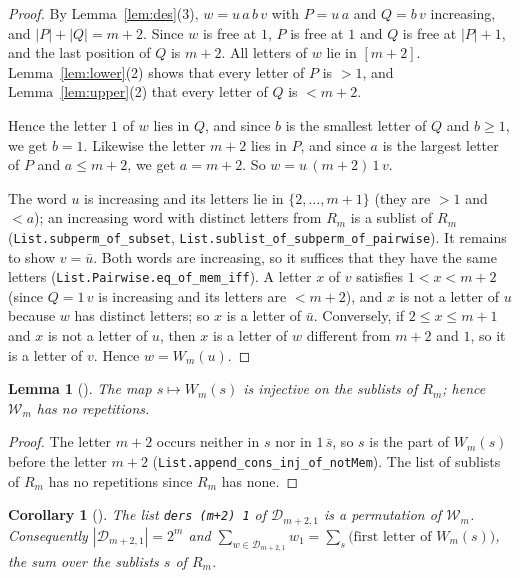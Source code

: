\documentclass[11pt]{amsart}
\theoremstyle{plain}
\newtheorem{lemma}[theorem]{Lemma}
\newtheorem{corollary}[theorem]{Corollary}
\theoremstyle{definition}
\newcommand{\cD}{\mathcal{D}}
\begin{document}
\begin{proof}
By Lemma~\ref{lem:des}(3), $w=u\,a\,b\,v$ with $P=u\,a$ and $Q=b\,v$ increasing, and $|P|+|Q|=m+2$. Since $w$ is free at $1$, $P$ is free at $1$ and $Q$ is free at $|P|+1$, and the last position of $Q$ is $m+2$. All letters of $w$ lie in $[m+2]$. Lemma~\ref{lem:lower}(2) shows that every letter of $P$ is $>1$, and Lemma~\ref{lem:upper}(2) that every letter of $Q$ is $<m+2$.

Hence the letter $1$ of $w$ lies in $Q$, and since $b$ is the smallest letter of $Q$ and $b\ge1$, we get $b=1$. Likewise the letter $m+2$ lies in $P$, and since $a$ is the largest letter of $P$ and $a\le m+2$, we get $a=m+2$. So $w=u\,(m+2)\,1\,v$.

The word $u$ is increasing and its letters lie in $\{2,\dots,m+1\}$ (they are $>1$ and $<a$); an increasing word with distinct letters from $R_m$ is a sublist of $R_m$ (\texttt{List.subperm\_of\_subset}, \texttt{List.sublist\_of\_subperm\_of\_pairwise}). It remains to show $v=\bar u$. Both words are increasing, so it suffices that they have the same letters (\texttt{List.Pairwise.eq\_of\_mem\_iff}). A letter $x$ of $v$ satisfies $1<x<m+2$ (since $Q=1\,v$ is increasing and its letters are $<m+2$), and $x$ is not a letter of $u$ because $w$ has distinct letters; so $x$ is a letter of $\bar u$. Conversely, if $2\le x\le m+1$ and $x$ is not a letter of $u$, then $x$ is a letter of $w$ different from $m+2$ and $1$, so it is a letter of $v$. Hence $w=W_m(u)$.
\end{proof}

\begin{lemma}[]\label{lem:inj}
The map $s\mapsto W_m(s)$ is injective on the sublists of $R_m$; hence $\mathcal W_m$ has no repetitions.
\end{lemma}

\begin{proof}
The letter $m+2$ occurs neither in $s$ nor in $1\,\bar s$, so $s$ is the part of $W_m(s)$ before the letter $m+2$ (\texttt{List.append\_cons\_inj\_of\_notMem}). The list of sublists of $R_m$ has no repetitions since $R_m$ has none.
\end{proof}

\begin{corollary}[]\label{cor:perm}
The list \texttt{ders (m+2) 1} of $\cD_{m+2,1}$ is a permutation of $\mathcal W_m$. Consequently $|\cD_{m+2,1}|=2^m$ and $\sum_{w\in\cD_{m+2,1}}w_1=\sum_{s}\bigl(\text{first letter of }W_m(s)\bigr)$, the sum over the sublists $s$ of $R_m$.
\end{corollary}
\end{document}
